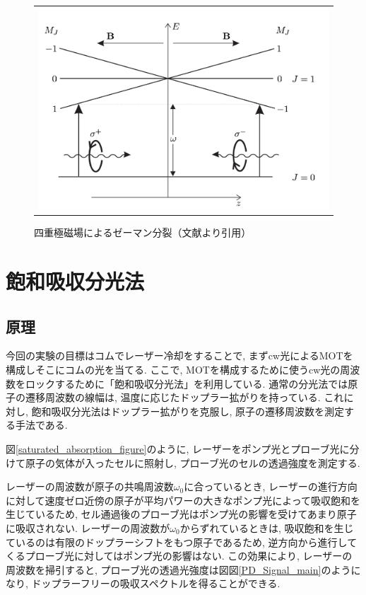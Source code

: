 \documentclass[uplatex, dvipdfmx, a4paper, report, papersize, 11pt]{jsbook}
\begin{document}
\begin{figure}[htpb]
\begin{tabular}{c}
      \begin{minipage}{0.50\hsize}
        \centering
          \includegraphics[keepaspectratio,  scale=0.40,  angle=0]
                          {figures/chapter2/MOT_zeeman_split.png}
                          \caption{四重極磁場によるゼーマン分裂（文献\cite{Foot:1080846}より引用）}
                          \label{MOT_zeeman_split}
      \end{minipage}


    \end{tabular}
\end{figure}

\newpage
\section{飽和吸収分光法}
\subsection{原理}
今回の実験の目標はコムでレーザー冷却をすることで, まずcw光によるMOTを構成しそこにコムの光を当てる. ここで, MOTを構成するために使うcw光の周波数をロックするために「飽和吸収分光法」を利用している. 通常の分光法では原子の遷移周波数の線幅は, 温度に応じたドップラー拡がりを持っている. これに対し, 飽和吸収分光法はドップラー拡がりを克服し, 原子の遷移周波数を測定する手法である. \par
図\ref{saturated_absorption_figure}のように, レーザーをポンプ光とプローブ光に分けて原子の気体が入ったセルに照射し, プローブ光のセルの透過強度を測定する.\par
レーザーの周波数が原子の共鳴周波数$\omega_0$に合っているとき, レーザーの進行方向に対して速度ゼロ近傍の原子が平均パワーの大きなポンプ光によって吸収飽和を生じているため, セル通過後のプローブ光はポンプ光の影響を受けてあまり原子に吸収されない. レーザーの周波数が$\omega_0$からずれているときは, 吸収飽和を生じているのは有限のドップラーシフトをもつ原子であるため, 逆方向から進行してくるプローブ光に対してはポンプ光の影響はない. この効果により, レーザーの周波数を掃引すると, プローブ光の透過光強度は図図\ref{PD_Signal_main}のようになり, ドップラーフリーの吸収スペクトルを得ることができる.
\end{document}
